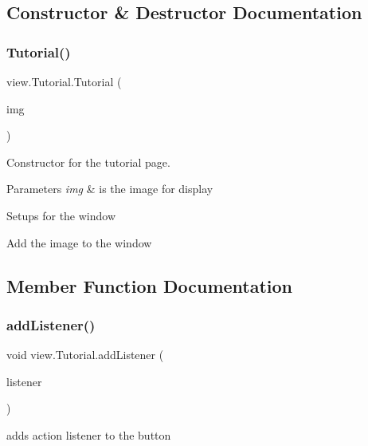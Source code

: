 \subsection{Constructor \& Destructor Documentation}
\hypertarget{classview_1_1_tutorial_a0b4dd05d8cf555062780668eb39b9c10}{}\label{classview_1_1_tutorial_a0b4dd05d8cf555062780668eb39b9c10} 
\subsubsection{\texorpdfstring{Tutorial()}{Tutorial()}}
{\footnotesize\ttfamily view.\+Tutorial.\+Tutorial (\begin{DoxyParamCaption}\item[{Image\+Icon}]{img }\end{DoxyParamCaption})}



Constructor for the tutorial page. 


\begin{DoxyParams}{Parameters}
{\em img} & is the image for display \\
\hline
\end{DoxyParams}
Setups for the window

Add the image to the window

\subsection{Member Function Documentation}
\hypertarget{classview_1_1_tutorial_ab7c6fa062c2541f1b02f1c31f8043811}{}\label{classview_1_1_tutorial_ab7c6fa062c2541f1b02f1c31f8043811} 
\subsubsection{\texorpdfstring{add\+Listener()}{addListener()}}
{\footnotesize\ttfamily void view.\+Tutorial.\+add\+Listener (\begin{DoxyParamCaption}\item[{Action\+Listener}]{listener }\end{DoxyParamCaption})}



adds action listener to the button 


